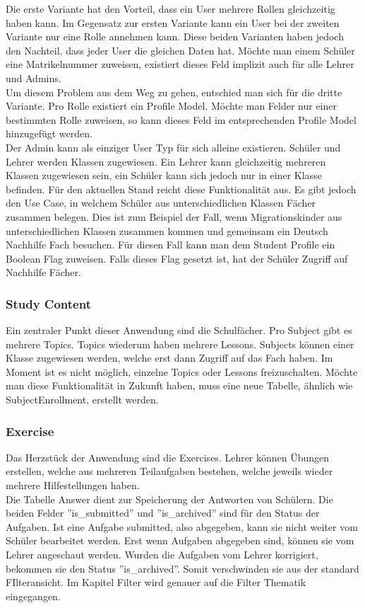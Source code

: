 Die erste Variante hat den Vorteil, dass ein User mehrere Rollen gleichzeitig haben kann. Im Gegensatz zur ersten Variante kann ein User bei der zweiten Variante nur eine Rolle annehmen kann. Diese beiden Varianten haben jedoch den Nachteil, dass jeder User die gleichen Daten hat. Möchte man einem Schüler eine Matrikelnummer zuweisen, existiert dieses Feld implizit auch für alle Lehrer und Admins. \\
Um diesem Problem aus dem Weg zu gehen, entschied man sich für die dritte Variante. Pro Rolle existiert ein Profile Model. Möchte man Felder nur einer bestimmten Rolle zuweisen, so kann dieses Feld im entsprechenden Profile Model hinzugefügt werden. \\
Der Admin kann als einziger User Typ für sich alleine existieren. Schüler und Lehrer werden Klassen zugewiesen. Ein Lehrer kann gleichzeitig mehreren Klassen zugewiesen sein, ein Schüler kann sich jedoch nur in einer Klasse befinden. Für den aktuellen Stand reicht diese Funktionalität aus. Es gibt jedoch den Use Case, in welchem Schüler aus unterschiedlichen Klassen Fächer zusammen belegen. Dies ist zum Beispiel der Fall, wenn Migrationskinder aus unterschiedlichen Klassen zusammen kommen und gemeinsam ein Deutsch Nachhilfe Fach besuchen. Für diesen Fall kann man dem Student Profile ein Boolean Flag zuweisen. Falls dieses Flag gesetzt ist, hat der Schüler Zugriff auf Nachhilfe Fächer.


\subsubsection*{Study Content}
Ein zentraler Punkt dieser Anwendung sind die Schulfächer. Pro Subject gibt es mehrere Topics. Topics wiederum haben mehrere Lessons. Subjects können einer Klasse zugewiesen werden, welche erst dann Zugriff auf das Fach haben. Im Moment ist es nicht möglich, einzelne Topics oder Lessons freizuschalten. Möchte man diese Funktionalität in Zukunft haben, muss eine neue Tabelle, ähnlich wie SubjectEnrollment, erstellt werden.

\subsubsection*{Exercise}
Das Herzstück der Anwendung sind die Exercises. Lehrer können Übungen erstellen, welche aus mehreren Teilaufgaben bestehen, welche jeweils wieder mehrere Hilfestellungen haben. \\
Die Tabelle Answer dient zur Speicherung der Antworten von Schülern. Die beiden Felder ''is\_submitted'' und ''is\_archived'' sind für den Status der Aufgaben. Ist eine Aufgabe submitted, also abgegeben, kann sie nicht weiter vom Schüler bearbeitet werden. Erst wenn Aufgaben abgegeben sind, können sie vom Lehrer angeschaut werden. Wurden die Aufgaben vom Lehrer korrigiert, bekommen sie den Status ''is\_archived''. Somit verschwinden sie aus der standard FIlteransicht. Im Kapitel Filter wird genauer auf die Filter Thematik eingegangen.
